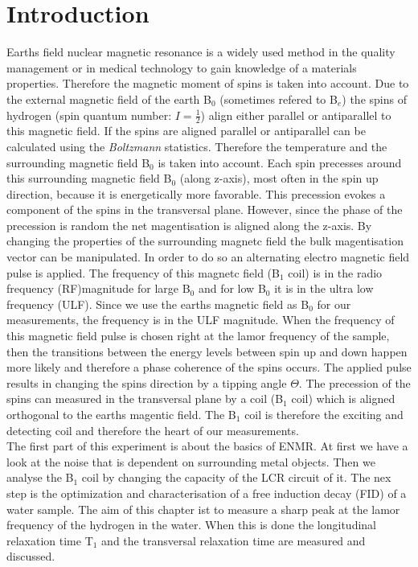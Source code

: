 \section{Introduction}
\label{sec:Introduction}
Earths field nuclear magnetic resonance is a widely used method in the quality management or in medical technology to gain knowledge of a materials properties. Therefore the magnetic moment of spins is taken into account.\newline
Due to the external magnetic field of the earth B$_0$ (sometimes refered to B$_e$) the spins of hydrogen (spin quantum number: $I=\frac{1}{2}$) align either parallel or antiparallel to this magnetic field. If the spins are aligned parallel or antiparallel can be calculated using the \textit{Boltzmann} statistics. Therefore the temperature and the surrounding magnetic field B$_0$ is taken into account. Each spin precesses around this surrounding magnetic field B$_0$ (along z-axis), most often in the spin up direction, because it is energetically more favorable. This precession evokes a component of the spins in the transversal plane. However, since the phase of the precession is random the net magentisation is aligned along the z-axis. By changing the properties of the surrounding magnetc field the bulk magentisation vector can be manipulated. In order to do so an alternating electro magnetic field pulse is applied. The frequency of this magnetc field (B$_1$ coil) is in the radio frequency (RF)magnitude for large B$_0$ and for low B$_0$ it is in the ultra low frequency (ULF). Since we use the earths magnetic field as B$_0$ for our measurements, the frequency is in the ULF magnitude. When the frequency of this magnetic field pulse is chosen right at the lamor frequency of the sample, then the transitions between the energy levels between spin up and down happen more likely and therefore a phase coherence of the spins occurs. The applied pulse results in changing the spins direction by a tipping angle $\Theta$. The precession of the spins can measured in the transversal plane by a coil (B$_1$ coil) which is aligned orthogonal to the earths magentic field. The B$_1$ coil is therefore the exciting and detecting coil and therefore the heart of our measurements. \\
The first part of this experiment is about the basics of ENMR. At first we have a look at the noise that is dependent on surrounding metal objects. Then we analyse the B$_1$ coil by changing the capacity of the LCR circuit of it. The nex step is the optimization and characterisation of a free induction decay (FID) of a water sample. The aim of this chapter ist to measure a sharp peak at the lamor frequency of the hydrogen in the water. When this is done the longitudinal relaxation time T$_1$ and the transversal relaxation time are measured and discussed.
